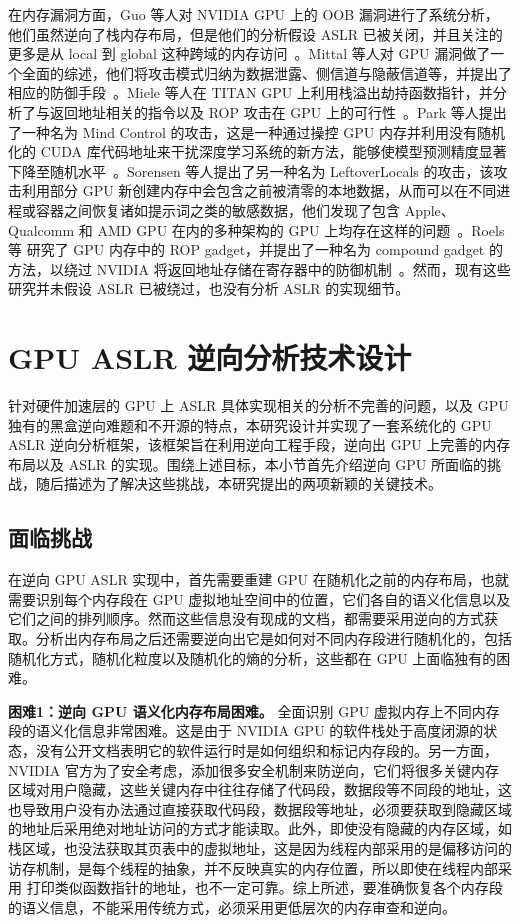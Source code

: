 在内存漏洞方面，Guo 等人对 NVIDIA GPU 上的 OOB 漏洞进行了系统分析，他们虽然逆向了栈内存布局，但是他们的分析假设 ASLR 已被关闭，并且关注的更多是从 local 到 global 这种跨域的内存访问~\cite{yanan:profit_for_fun}。Mittal 等人对 GPU 漏洞做了一个全面的综述，他们将攻击模式归纳为数据泄露、侧信道与隐蔽信道等，并提出了相应的防御手段~\cite{mittal2018survey}。Miele 等人在 TITAN GPU 上利用栈溢出劫持函数指针，并分析了与返回地址相关的指令以及 ROP 攻击在 GPU 上的可行性~\cite{miele2016buffer}。Park 等人提出了一种名为 Mind Control 的攻击，这是一种通过操控 GPU 内存并利用没有随机化的 CUDA 库代码地址来干扰深度学习系统的新方法，能够使模型预测精度显著下降至随机水平~\cite{park2020mind}。Sorensen 等人提出了另一种名为 LeftoverLocals 的攻击，该攻击利用部分 GPU 新创建内存中会包含之前被清零的本地数据，从而可以在不同进程或容器之间恢复诸如提示词之类的敏感数据，他们发现了包含 Apple、Qualcomm 和 AMD GPU 在内的多种架构的 GPU 上均存在这样的问题~\cite{tyler2024leftoverlocals}。Roels 等 研究了 GPU 内存中的 ROP gadget，并提出了一种名为 compound gadget 的方法，以绕过 NVIDIA 将返回地址存储在寄存器中的防御机制~\cite{returning_exploits2025}。然而，现有这些研究并未假设 ASLR 已被绕过，也没有分析 ASLR 的实现细节。

\section{GPU ASLR 逆向分析技术设计}
针对硬件加速层的 GPU 上 ASLR 具体实现相关的分析不完善的问题，以及 GPU 独有的黑盒逆向难题和不开源的特点，本研究设计并实现了一套系统化的 GPU ASLR 逆向分析框架，该框架旨在利用逆向工程手段，逆向出 GPU 上完善的内存布局以及 ASLR 的实现。围绕上述目标，本小节首先介绍逆向 GPU 所面临的挑战，随后描述为了解决这些挑战，本研究提出的两项新颖的关键技术。

\subsection{面临挑战}
在逆向 GPU ASLR 实现中，首先需要重建 GPU 在随机化之前的内存布局，也就需要识别每个内存段在 GPU 虚拟地址空间中的位置，它们各自的语义化信息以及它们之间的排列顺序。然而这些信息没有现成的文档，都需要采用逆向的方式获取。分析出内存布局之后还需要逆向出它是如何对不同内存段进行随机化的，包括随机化方式，随机化粒度以及随机化的熵的分析，这些都在 GPU 上面临独有的困难。

\textbf{困难1：逆向 GPU 语义化内存布局困难。}
全面识别 GPU 虚拟内存上不同内存段的语义化信息非常困难。这是由于 NVIDIA GPU 的软件栈处于高度闭源的状态，没有公开文档表明它的软件运行时是如何组织和标记内存段的。另一方面，NVIDIA 官方为了安全考虑，添加很多安全机制来防逆向，它们将很多关键内存区域对用户隐藏，这些关键内存中往往存储了代码段，数据段等不同段的地址，这也导致用户没有办法通过直接获取代码段，数据段等地址，必须要获取到隐藏区域的地址后采用绝对地址访问的方式才能读取。此外，即使没有隐藏的内存区域，如栈区域，也没法获取其页表中的虚拟地址，这是因为线程内部采用的是偏移访问的访存机制，是每个线程的抽象，并不反映真实的内存位置，所以即使在线程内部采用  打印类似函数指针的地址，也不一定可靠。综上所述，要准确恢复各个内存段的语义信息，不能采用传统方式，必须采用更低层次的内存审查和逆向。

